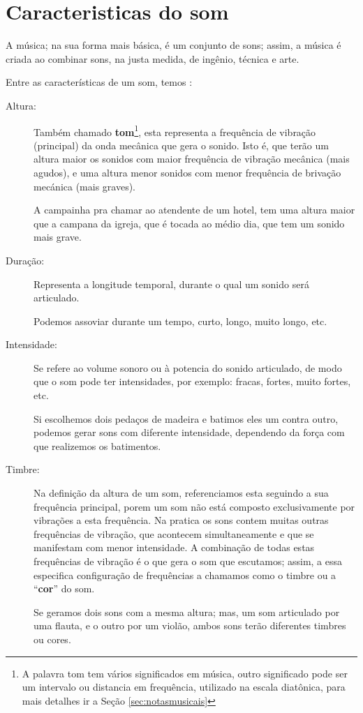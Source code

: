 
\section{Caracteristicas do som}

A música; na sua forma mais básica,  é um conjunto de sons; assim, 
a música é criada ao combinar sons, na justa medida, de 
ingênio, técnica e arte.

Entre as características de um som, temos \cite[pp. 12]{medteoria} :
\begin{description}
\item [Altura:] \label{sec:pos:Altura} 
Também chamado \textbf{tom}\footnote{A palavra tom tem vários significados em música, 
outro significado pode ser um intervalo ou distancia em frequência, 
utilizado na escala diatônica, para mais detalhes ir a Seção \ref{sec:notasmusicais}}, esta representa a frequência de vibração (principal) da onda mecânica que gera o sonido.
Isto é, que terão um altura maior os sonidos com maior frequência de vibração mecânica (mais agudos), 
e uma altura menor sonidos com menor frequência de brivação mecánica (mais graves).
\begin{example}
A campainha pra chamar ao atendente de um hotel, 
tem uma altura maior que a campana da igreja, 
que é tocada ao médio dia, que tem um sonido mais grave.
\end{example} 
\item [Duração:] \label{sec:pos:Duracion}
Representa a longitude temporal, durante o qual um sonido será articulado.
\begin{example}
Podemos assoviar durante um tempo, curto, longo, muito longo, etc.
\end{example} 
\item [Intensidade:] \label{sec:pos:Intensidade}
Se refere ao volume sonoro ou à potencia do sonido articulado, 
de modo que o som pode ter intensidades, por exemplo: fracas, fortes, muito fortes, etc.  
\begin{example}
Si escolhemos dois pedaços de madeira e batimos eles um contra outro, 
podemos gerar sons com diferente intensidade, dependendo da força com que realizemos os batimentos.
\end{example} 
\item [Timbre:] \label{sec:pos:timbre}
Na definição da altura de um som, referenciamos esta seguindo a sua frequência principal,
porem um som não está composto exclusivamente por vibrações a esta frequência.
Na pratica os sons contem muitas outras frequências de vibração, que acontecem simultaneamente e 
que se manifestam com menor intensidade.
A combinação de todas estas frequências de vibração é o que gera o som que escutamos;
assim, a essa especifica configuração de frequências a chamamos como o timbre ou
a ``\textbf{cor}'' do som.
\begin{example}
Se geramos dois sons com a mesma altura; mas, um som articulado por uma flauta,
e o outro por um violão, ambos sons terão diferentes timbres ou cores.
\end{example} 
\end{description}
